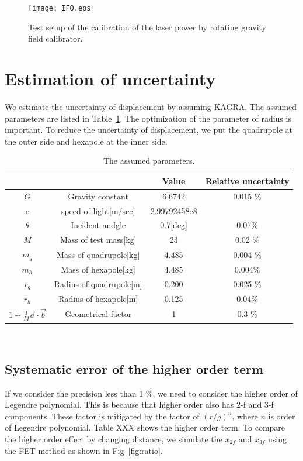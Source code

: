 \documentclass[]{spie}  %
\begin{document}
\begin{figure}
\begin{center}
\texttt{[image: IFO.eps]}
\caption{Test setup of the calibration of the laser power by rotating gravity field calibrator.}
\label{fig:IFO}
\end{center}
\end{figure}

\section{Estimation of uncertainty}
We estimate the uncertainty of displacement by assuming KAGRA. The assumed parameters are listed in Table~\ref{sus}. The optimization of the parameter of radius is important. To reduce the uncertainty of displacement, we put the quadrupole at the outer side and hexapole at the inner side.
\begin{table}
\begin{center}
\caption{\label{sus}The assumed parameters.}
\footnotesize
\begin{tabular}{cccc}
\hline
&&Value&Relative uncertainty \\
\hline
$G$& Gravity constant&6.6742&0.015 \%\\
$c$& speed of light[m/sec]&2.99792458e8&\\
$\theta$& Incident andgle&0.7[deg]& 0.07\%\\
$M$& Mass of test mass[kg]&23 & 0.02 \%\\
$m_q$&Mass of quadrupole[kg]&4.485 & 0.004 \%\\
$m_h$&Mass of hexapole[kg]& 4.485 &0.004\%\\
$r_q$&Radius of quadrupole[m]&0.200 & 0.025 \%\\
$r_h$&Radius of hexapole[m]& 0.125 & 0.04\%\\
$1+\frac{I}{M}\vec{a}\cdot \vec{b}$& Geometrical factor & 1&0.3 \% \\
\hline
\end{tabular}\\
\end{center}
\end{table}

\subsection{Systematic error of the higher order term}
If we consider the precision less than 1 \%, we need to consider the higher order of Legendre polynomial. This is because that higher order also has 2-f and 3-f components. These factor is mitigated by the factor of $(r/g)^n$, where $n$ is order of Legendre polynomial. Table XXX shows the higher order term. To compare the higher order effect by changing distance, we simulate the $x_{2f}$ and $x_{3f}$ using the FET method as shown in Fig~\ref{fig:ratio}. 
\end{document}
